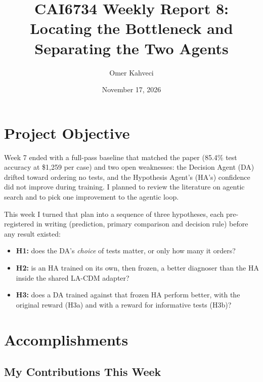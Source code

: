\documentclass[11pt]{article}
\title{CAI6734 Weekly Report 8: Locating the Bottleneck and Separating the Two Agents}
\author{Omer Kahveci}
\date{November 17, 2026}
\begin{document}
\maketitle

\section{Project Objective}

Week 7 ended with a full-pass baseline that matched the paper (85.4\% test
accuracy at \$1,259 per case) and two open weaknesses: the Decision Agent (DA)
drifted toward ordering no tests, and the Hypothesis Agent's (HA's) confidence
did not improve during training. I planned to review the literature on agentic
search and to pick one improvement to the agentic loop.

This week I turned that plan into a sequence of three hypotheses, each
pre-registered in writing (prediction, primary comparison and decision rule)
before any result existed:

\begin{itemize}
  \item \textbf{H1:} does the DA's \emph{choice} of tests matter, or only how
        many it orders?
  \item \textbf{H2:} is an HA trained on its own, then frozen, a better
        diagnoser than the HA inside the shared LA-CDM adapter?
  \item \textbf{H3:} does a DA trained against that frozen HA perform better,
        with the original reward (H3a) and with a reward for informative tests
        (H3b)?
\end{itemize}

\section{Accomplishments}

\subsection*{My Contributions This Week}
\end{document}
